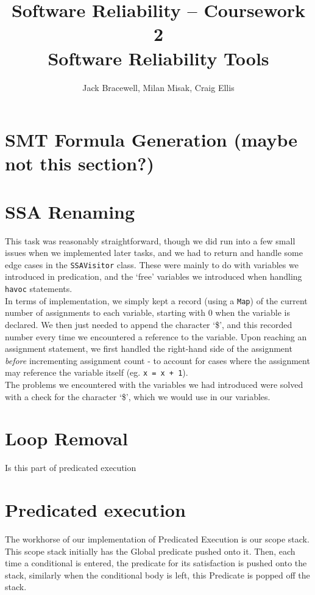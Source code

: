 \documentclass[11pt]{article}
\title{Software Reliability -- Coursework 2 \\ Software Reliability Tools}
\author{Jack Bracewell, Milan Misak, Craig Ellis}
\date{}
\begin{document}
\maketitle

\section{SMT Formula Generation (maybe not this section?)}
\section{SSA Renaming}

This task was reasonably straightforward, though we did run into a few small issues when we implemented later
tasks, and we had to return and handle some edge cases in the \verb|SSAVisitor| class. These were mainly to do
with variables we introduced in predication, and the `free' variables we introduced when handling \verb|havoc|
statements. \\

In terms of implementation, we simply kept a record (using a \verb|Map|) of the current number of assignments to
each variable, starting with 0 when the variable is declared. We then just needed to append the character `\$',
and this recorded number every time we encountered a reference to the variable. Upon reaching an assignment
statement, we first handled the right-hand side of the assignment \emph{before} incrementing assignment count -
to account for cases where the assignment may reference the variable itself (eg. \verb|x = x + 1|). \\

The problems we encountered with the variables we had introduced were solved with a check for the character `\$',
which we would use in our variables.

\section{Loop Removal}
Is this part of predicated execution
\section{Predicated execution}
The workhorse of our implementation of Predicated Execution is our scope stack. This scope stack initially
has the Global predicate pushed onto it. Then, each time a conditional is entered, the predicate for its
satisfaction is pushed onto the stack, similarly when the conditional body is left, this Predicate is
popped off the stack.\\
\end{document}
